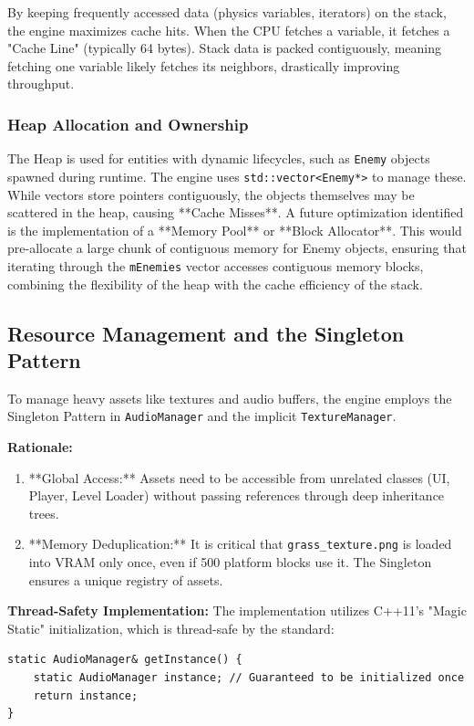 \documentclass[10pt, a4paper]{article}
\begin{document}
By keeping frequently accessed data (physics variables, iterators) on the stack, the engine maximizes cache hits. When the CPU fetches a variable, it fetches a "Cache Line" (typically 64 bytes). Stack data is packed contiguously, meaning fetching one variable likely fetches its neighbors, drastically improving throughput.

\subsubsection{Heap Allocation and Ownership}
The Heap is used for entities with dynamic lifecycles, such as \texttt{Enemy} objects spawned during runtime. The engine uses \texttt{std::vector<Enemy*>} to manage these.
While vectors store pointers contiguously, the objects themselves may be scattered in the heap, causing **Cache Misses**. A future optimization identified is the implementation of a **Memory Pool** or **Block Allocator**. This would pre-allocate a large chunk of contiguous memory for Enemy objects, ensuring that iterating through the \texttt{mEnemies} vector accesses contiguous memory blocks, combining the flexibility of the heap with the cache efficiency of the stack.

\subsection{Resource Management and the Singleton Pattern}
To manage heavy assets like textures and audio buffers, the engine employs the Singleton Pattern in \texttt{AudioManager} and the implicit \texttt{TextureManager}.

\textbf{Rationale:}
\begin{enumerate}
    \item **Global Access:** Assets need to be accessible from unrelated classes (UI, Player, Level Loader) without passing references through deep inheritance trees.
    \item **Memory Deduplication:** It is critical that \texttt{grass\_texture.png} is loaded into VRAM only once, even if 500 platform blocks use it. The Singleton ensures a unique registry of assets.
\end{enumerate}

\textbf{Thread-Safety Implementation:}
The implementation utilizes C++11's "Magic Static" initialization, which is thread-safe by the standard:
\begin{lstlisting}[style=cppstyle, caption={Thread-Safe Singleton}]
static AudioManager& getInstance() {
    static AudioManager instance; // Guaranteed to be initialized once
    return instance;
}
\end{lstlisting}
\end{document}
